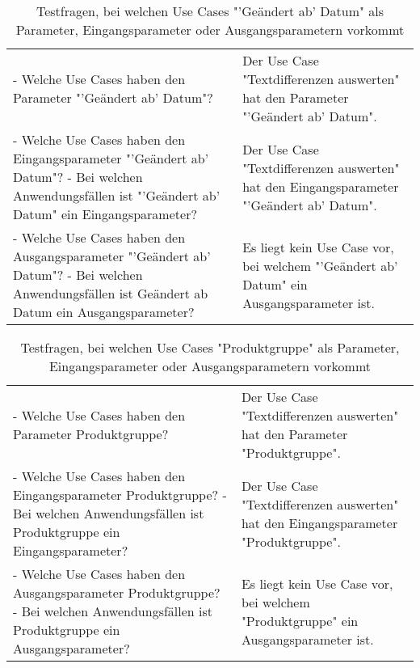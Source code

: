 \begin{table}[h]
	\myfloatalign
	\begin{tabularx}{\textwidth}{XX} \toprule
		\tableheadline{Fragen} & \tableheadline{Erwartete Antwort} \\
		\midrule
		- Welche Use Cases haben den Parameter "'Geändert ab' Datum"? & Der Use Case "Textdifferenzen auswerten" hat den Parameter "'Geändert ab' Datum". \\
		\midrule
		- Welche Use Cases haben den Eingangsparameter "'Geändert ab' Datum"? \newline - Bei welchen Anwendungsfällen ist "'Geändert ab' Datum" ein Eingangsparameter? & Der Use Case "Textdifferenzen auswerten" hat den Eingangsparameter "'Geändert ab' Datum". \\
		\midrule
		- Welche Use Cases haben den Ausgangsparameter "'Geändert ab' Datum"? \newline - Bei welchen Anwendungsfällen ist Geändert ab Datum ein Ausgangsparameter? & Es liegt kein Use Case vor, bei welchem "'Geändert ab' Datum" ein Ausgangsparameter ist. \\
		\bottomrule
	\end{tabularx}
	\caption[Testfragen, bei welchen Use Cases "'Geändert ab' Datum" als Parameter, Eingangsparameter oder  Ausgangsparametern vorkommt]{Testfragen, bei welchen Use Cases "'Geändert ab' Datum" als Parameter, Eingangsparameter oder  Ausgangsparametern vorkommt}
	\label{tab:testfragen:tbl12}
\end{table}
\begin{table}[h]
	\myfloatalign
	\begin{tabularx}{\textwidth}{XX}
	\toprule
	\tableheadline{Fragen} & \tableheadline{Erwartete Antwort} \\
	\midrule
	- Welche Use Cases haben den Parameter Produktgruppe? & Der Use Case "Textdifferenzen auswerten" hat den Parameter "Produktgruppe". \\
	\midrule
	- Welche Use Cases haben den Eingangsparameter Produktgruppe? \newline - Bei welchen Anwendungsfällen ist Produktgruppe ein Eingangsparameter? & Der Use Case "Textdifferenzen auswerten" hat den Eingangsparameter "Produktgruppe". \\
	\midrule
	- Welche Use Cases haben den Ausgangsparameter Produktgruppe? \newline - Bei welchen Anwendungsfällen ist Produktgruppe ein Ausgangsparameter? & Es liegt kein Use Case vor, bei welchem "Produktgruppe" ein Ausgangsparameter ist. \\
	\bottomrule
	\end{tabularx}
	\caption[Testfragen, bei welchen Use Cases "Produktgruppe" als Parameter, Eingangsparameter oder  Ausgangsparametern vorkommt]{Testfragen, bei welchen Use Cases "Produktgruppe" als Parameter, Eingangsparameter oder  Ausgangsparametern vorkommt}
	\label{tab:testfragen:tbl13}
\end{table}

